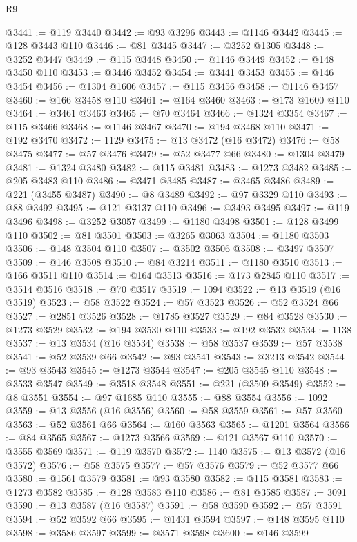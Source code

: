 \begin{lexlean}{R9}
\begin{coremodule}
@3441 := @119 @3440
@3442 := @93 @3296
@3443 := @1146 @3442
@3445 := @128 @3443 @110
@3446 := @81 @3445
@3447 := @3252 @1305
@3448 := @3252 @3447
@3449 := @115 @3448
@3450 := @1146 @3449
@3452 := @148 @3450 @110
@3453 := @3446 @3452
@3454 := @3441 @3453
@3455 := @146 @3454
@3456 := @1304 @1606
@3457 := @115 @3456
@3458 := @1146 @3457
@3460 := @166 @3458 @110
@3461 := @164 @3460
@3463 := @173 @1600 @110
@3464 := @3461 @3463
@3465 := @70 @3464
@3466 := @1324 @3354
@3467 := @115 @3466
@3468 := @1146 @3467
@3470 := @194 @3468 @110
@3471 := @192 @3470
@3472 := 1129
@3475 := @13 @3472 (@16 @3472)
@3476 := @58 @3475
@3477 := @57 @3476
@3479 := @52 @3477 @66
@3480 := @1304 @3479
@3481 := @1324 @3480
@3482 := @115 @3481
@3483 := @1273 @3482
@3485 := @205 @3483 @110
@3486 := @3471 @3485
@3487 := @3465 @3486
@3489 := @221 (@3455 @3487)
@3490 := @8 @3489
@3492 := @97 @3329 @110
@3493 := @88 @3492
@3495 := @121 @3137 @110
@3496 := @3493 @3495
@3497 := @119 @3496
@3498 := @3252 @3057
@3499 := @1180 @3498
@3501 := @128 @3499 @110
@3502 := @81 @3501
@3503 := @3265 @3063
@3504 := @1180 @3503
@3506 := @148 @3504 @110
@3507 := @3502 @3506
@3508 := @3497 @3507
@3509 := @146 @3508
@3510 := @84 @3214
@3511 := @1180 @3510
@3513 := @166 @3511 @110
@3514 := @164 @3513
@3516 := @173 @2845 @110
@3517 := @3514 @3516
@3518 := @70 @3517
@3519 := 1094
@3522 := @13 @3519 (@16 @3519)
@3523 := @58 @3522
@3524 := @57 @3523
@3526 := @52 @3524 @66
@3527 := @2851 @3526
@3528 := @1785 @3527
@3529 := @84 @3528
@3530 := @1273 @3529
@3532 := @194 @3530 @110
@3533 := @192 @3532
@3534 := 1138
@3537 := @13 @3534 (@16 @3534)
@3538 := @58 @3537
@3539 := @57 @3538
@3541 := @52 @3539 @66
@3542 := @93 @3541
@3543 := @3213 @3542
@3544 := @93 @3543
@3545 := @1273 @3544
@3547 := @205 @3545 @110
@3548 := @3533 @3547
@3549 := @3518 @3548
@3551 := @221 (@3509 @3549)
@3552 := @8 @3551
@3554 := @97 @1685 @110
@3555 := @88 @3554
@3556 := 1092
@3559 := @13 @3556 (@16 @3556)
@3560 := @58 @3559
@3561 := @57 @3560
@3563 := @52 @3561 @66
@3564 := @160 @3563
@3565 := @1201 @3564
@3566 := @84 @3565
@3567 := @1273 @3566
@3569 := @121 @3567 @110
@3570 := @3555 @3569
@3571 := @119 @3570
@3572 := 1140
@3575 := @13 @3572 (@16 @3572)
@3576 := @58 @3575
@3577 := @57 @3576
@3579 := @52 @3577 @66
@3580 := @1561 @3579
@3581 := @93 @3580
@3582 := @115 @3581
@3583 := @1273 @3582
@3585 := @128 @3583 @110
@3586 := @81 @3585
@3587 := 3091
@3590 := @13 @3587 (@16 @3587)
@3591 := @58 @3590
@3592 := @57 @3591
@3594 := @52 @3592 @66
@3595 := @1431 @3594
@3597 := @148 @3595 @110
@3598 := @3586 @3597
@3599 := @3571 @3598
@3600 := @146 @3599

\end{coremodule}
\end{lexlean}
